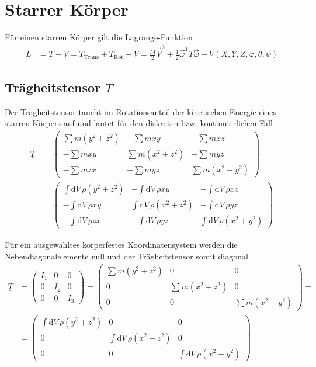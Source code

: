 \documentclass{article}
\newcommand{\diff}{\mathrm{d}}
\begin{document}
\newpage


\section{Starrer Körper}
Für einen starren Körper gilt die Lagrange-Funktion
	\begin{align}
		L &= T - V = T_\text{Trans} + T_\text{Rot} - V = \frac{M}{2}\vec{V}^2 + \frac{1}{2} \vec{\omega}^T \underline{T} \vec{\omega} - V(X, Y, Z, \varphi, \theta, \psi)
	\end{align}


\subsection{Trägheitstensor $\underline{T}$}
Der Trägheitstensor taucht im Rotationsanteil der kinetischen Energie eines starren Körpers auf und lautet für den diskreten bzw. kontinuierlichen Fall
	\begin{align}
		\underline{T} &=
		\begin{pmatrix}
			\sum m (y^2 + z^2) & - \sum m x y & -\sum m x z \\
			- \sum m x y & \sum m (x^2 + z^2) & -\sum m y z \\
			-\sum m z x & -\sum m y z & \sum m (x^2 + y^2)
		\end{pmatrix} = \\
		&= 
		\begin{pmatrix}
			\int \diff V\, \rho (y^2 + z^2) & - \int \diff V\, \rho x y & -\int \diff V\, \rho x z \\
			- \int \diff V\, \rho x y & \int \diff V\, \rho (x^2 + z^2) & -\int \diff V\, \rho y z \\
			-\int \diff V\, \rho z x & -\int \diff V\, \rho y z & \int \diff V\, \rho (x^2 + y^2)
		\end{pmatrix}
	\end{align}

Für ein ausgewähltes körperfestes Koordinatensystem werden die Nebendiagonalelemente null und der Trägheitstensor somit diagonal
	\begin{align}
		\underline{T} &=
		\begin{pmatrix}
			I_1 & 0 & 0 \\
			0 & I_2 & 0 \\
			0 & 0 & I_3
		\end{pmatrix} =
		\begin{pmatrix}
			\sum m (y^2 + z^2) & 0 & 0 \\
			0 & \sum m (x^2 + z^2) & 0 \\
			0 & 0 & \sum m (x^2 + y^2)
		\end{pmatrix} = \\
		&= 
		\begin{pmatrix}
			\int \diff V\, \rho (y^2 + z^2) & 0 & 0 \\
			0 & \int \diff V\, \rho (x^2 + z^2) & 0 \\
			0 & 0 & \int \diff V\, \rho (x^2 + y^2)
		\end{pmatrix}
	\end{align}
\end{document}
